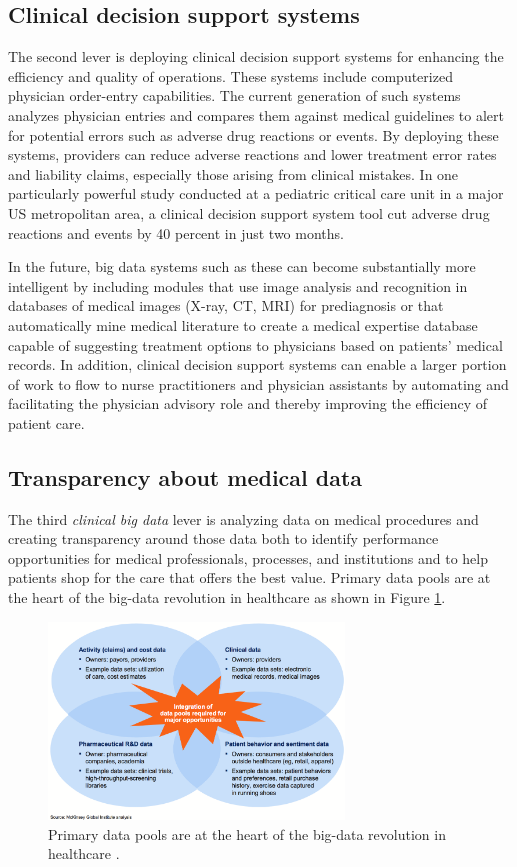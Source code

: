 \documentclass[twocolumn]{article}
\begin{document}
\subsection{Clinical decision support systems}
The second lever is deploying clinical decision support systems for enhancing the efficiency and quality of operations. These systems include computerized physician order-entry capabilities. The current generation of such systems analyzes physician entries and compares them against medical guidelines to alert for potential errors such as adverse drug reactions or events. By deploying these systems, providers can reduce adverse reactions and lower treatment error rates and liability claims, especially those arising from clinical mistakes. In one particularly powerful study conducted at a pediatric critical care unit in a major US metropolitan area, a clinical decision support system tool cut adverse drug reactions and events by 40 percent in just two months.

In the future, big data systems such as these can become substantially more intelligent by including modules that use image analysis and recognition in databases of medical images (X-ray, CT, MRI) for prediagnosis or that automatically mine medical literature to create a medical expertise database capable of suggesting treatment options to physicians based on patients’ medical records. In addition, clinical decision support systems can enable a larger portion of work to flow to nurse practitioners and physician assistants by automating and facilitating the physician advisory role and thereby improving the efficiency of patient care.

\subsection{Transparency about medical data}
The third \textit{clinical big data} lever is analyzing data on medical procedures and creating transparency around those data both to identify performance opportunities for medical professionals, processes, and institutions and to help patients shop for the care that offers the best value. Primary data pools are at the heart of the big-data revolution in healthcare as shown in Figure \ref{fig:data-pools}.

\begin{figure}[htb]
        \centering
        \includegraphics[width=0.7\textwidth]{data-pools.png}
        \caption{Primary data pools are at the heart of the big-data revolution in healthcare \cite{Groves:2013}.}
        \label{fig:data-pools}
\end{figure}
\end{document}

